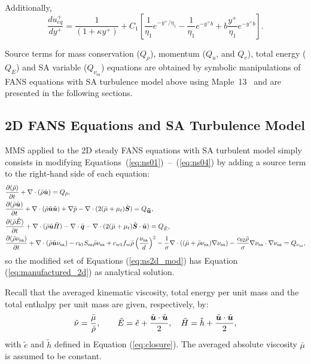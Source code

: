 \documentclass[10pt]{article}
\newcommand{\Diff}[2] {\dfrac{\partial( #1)}{\partial #2}}
\newcommand{\bv}[1]{\ensuremath{\mbox{\boldmath$ #1 $}}}
\newcommand{\dd}[2]{\frac{d #1}{d #2}}
\newcommand{\sa}{\nu_{\mathrm{sa}}}
\newcommand{\tsa}{\mathrm{sa}}
\newcommand{\brho}{\bar{\rho}}
\newcommand{\tu}{\tilde{u}}
\newcommand{\tE}{\tilde{E}}
\newcommand{\bmu}{\bar{\mu}}
\begin{document}
Additionally,
\begin{equation}\label{dueqplus}
\dd{u_{eq}^+}{y^+} = \frac{1}{\left( 1 + \kappa y^+ \right)} + C_1 \left[ \frac{1}{\eta_1} e^{-y^+/\eta_1} - \frac{1}{\eta_1} e^{-y^+ b} + b \frac{y^+}{\eta_1} e^{-y^+ b} \right].
\end{equation}



Source terms  for mass conservation ($Q_\rho$), momentum ($Q_u$, and $Q_v$), total energy ($Q_{E}$) and SA variable ($Q_{\sa}$) equations are obtained by symbolic manipulations of FANS equations with SA turbulence model above using Maple~13~\citep{Maple} and are presented in the following sections.



 \subsection{2D FANS Equations and SA Turbulence Model}\label{NS+SA}



MMS applied to the 2D steady FANS equations with SA turbulent model simply consists in modifying Equations~(\ref{eq:ns01})~--~(\ref{eq:ns04}) by adding a source term to the right-hand side of each equation:
 \begin{equation}
 \begin{split} \label{eq:ns2d_mod}
 &\Diff{\bar{\rho}}{t} +\nabla \cdot \left(\bar{\rho} \tilde{\bv{u}}\right) = Q_{\brho},\\
 &\Diff{\bar{\rho} \tilde{\bv{u}}}{t} +\nabla\cdot\left(\bar{\rho} \tilde{\bv{u}}\tilde{\bv{u}}\right) +\nabla \bar{p} -  \nabla \cdot ( 2(\bmu+\mu_t) \tilde{\bv{S}} )= Q_{\bv{\tu}},\\
 & \Diff{\bar{\rho} \tilde{E}}{t}+ \nabla \cdot (\bar{\rho} \tilde{\bv{u}} \tilde{H})-\nabla \cdot \bar{\bv{q}} - \nabla\cdot(2 (\bmu+\mu_t) \tilde{\bv{S}} \cdot \tilde{\bv{u}})= Q_{\tE},\\
 &\Diff{\bar{\rho} \sa}{t} +\nabla \cdot (\bar{\rho} \tilde{\bv{u}} \sa) - c_{b1} S_\tsa \bar{\rho} \sa +c_{w1} f_w \brho \left(\dfrac{\sa}{d}\right)^2 - \dfrac{1}{\sigma}\nabla \cdot \left( (\bmu+\bar{\rho}  \sa) \nabla \sa\right) -\dfrac{c_{b2} \bar{\rho} }{\sigma} \nabla \sa \cdot \nabla \sa =Q_{\sa},
 \end{split}
 \end{equation}
so the modified set of Equations (\ref{eq:ns2d_mod}) has Equation (\ref{eq:manufactured_2d}) as analytical solution.

Recall that the averaged kinematic viscosity, total energy per unit mass and the total enthalpy per unit mass are given, respectively, by:
\begin{equation}
 \begin{split}\label{eq:closure01}
  \tilde{\nu}=\dfrac{\bar{\mu}}{\bar{\rho}},\qquad \tilde{E}=\tilde{e}+\dfrac{\tilde{\bv{u}}\cdot \tilde{\bv{u}}}{2}, \quad \tilde{H}=\tilde{h}+\dfrac{\tilde{\bv{u}}\cdot \tilde{\bv{u}}}{2},
 \end{split}
\end{equation}
with $\tilde{e}$ and $\tilde{h}$ defined in Equation (\ref{eq:closure}). The averaged absolute viscosity $\bmu$ is assumed to be constant.
\end{document}
